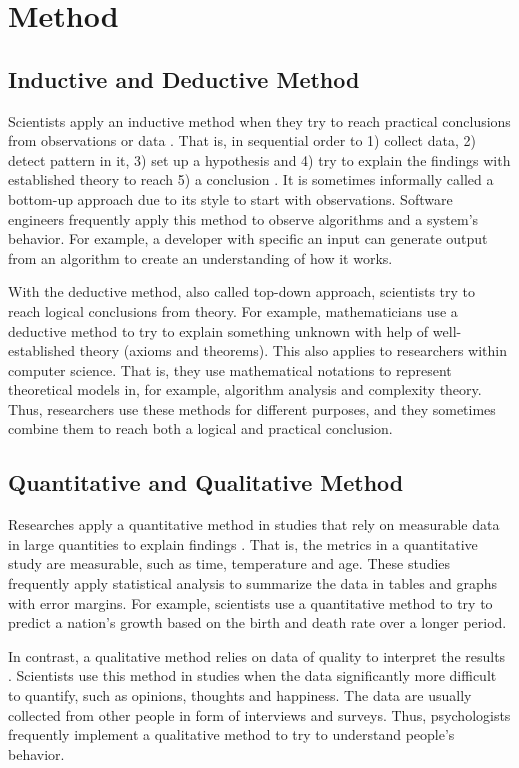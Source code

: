 \documentclass[a4paper,11pt]{kth-mag}
\newcommand*{\skippara}{\par\vspace{\baselineskip} \noindent}
\begin{document}
\chapter{Method}

\section{Inductive and Deductive Method}
Scientists apply an inductive method when they try to reach practical conclusions from observations or data \cite{Omexperi69:online}.
That is, in sequential order to 1) collect data, 2) detect pattern in it, 3) set up a hypothesis and 4) try to explain the findings with established theory to reach 5) a conclusion \cite{web:induction}.
It is sometimes informally called a bottom-up approach due to its style to start with observations.
Software engineers frequently apply this method to observe algorithms and a system's behavior.
For example, a developer with specific an input can generate output from an algorithm to create an understanding of how it works.

\skippara With the deductive method, also called top-down approach, scientists try to reach logical conclusions from theory.
For example, mathematicians use a deductive method to try to explain something unknown with help of well-established theory (axioms and theorems).
This also applies to researchers within computer science.
That is, they use mathematical notations to represent theoretical models in, for example, algorithm analysis and complexity theory.
Thus, researchers use these methods for different purposes, and they sometimes combine them to reach both a logical and practical conclusion.

\section{Quantitative and Qualitative Method}

Researches apply a quantitative method in studies that rely on measurable data in large quantities to explain findings \cite{haakansson2013portal}.
That is, the metrics in a quantitative study are measurable, such as time, temperature and age.
These studies frequently apply statistical analysis to summarize the data in tables and graphs with error margins.
For example, scientists use a quantitative method to try to predict a nation's growth based on the birth and death rate over a longer period.

\skippara In contrast, a qualitative method relies on data of quality to interpret the results \cite{merriam2009qualitative}.
Scientists use this method in studies when the data significantly more difficult to quantify, such as opinions, thoughts and happiness.
The data are usually collected from other people in form of interviews and surveys.
Thus, psychologists frequently implement a qualitative method to try to understand people's behavior.
\end{document}
